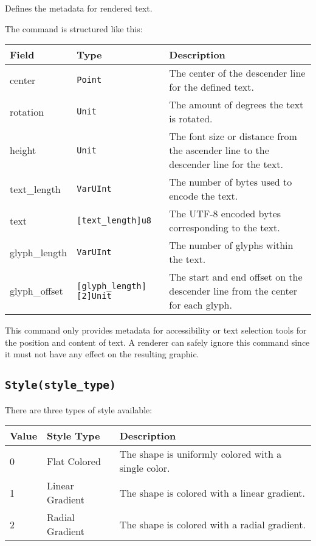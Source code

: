 \documentclass[]{article}
\begin{document}
Defines the metadata for rendered text.

The command is structured like this:

\begin{longtable}[]{@{}p{1in}p{1.6in}p{3.4in}@{}}
\toprule
Field & Type & Description \\
\midrule
\endhead
center        & \texttt{Point}                          & The center of the descender line for the defined text. \\
rotation      & \texttt{Unit}                           & The amount of degrees the text is rotated. \\
height        & \texttt{Unit}                           & The font size or distance from the ascender line to the descender line for the text. \\
text\_length  & \texttt{VarUInt}                        & The number of bytes used to encode the text. \\
text          & \texttt{{[}text\_length{]}u8}           & The UTF-8 encoded bytes corresponding to the text. \\
glyph\_length & \texttt{VarUInt}                        & The number of glyphs within the text. \\
glyph\_offset & \texttt{{[}glyph\_length{]}{[}2{]}Unit} & The start and end offset on the descender line from the center for each glyph. \\
\bottomrule
\end{longtable}

This command only provides metadata for accessibility or text selection tools
for the position and content of text. A renderer can safely ignore this command
since it must not have any effect on the resulting graphic.

\hypertarget{stylestyle_type}{\subsection{\texorpdfstring{\texttt{Style(style\_type)}}{Style(style\_type)}}\label{stylestyle_type}}

There are three types of style available:

\begin{longtable}[]{@{}p{0.5in}p{1in}p{4.5in}@{}}
\toprule
Value & Style Type & Description \\
\midrule
\endhead
0 & Flat Colored & The shape is uniformly colored with a single
color. \\
1 & Linear Gradient & The shape is colored with a linear gradient. \\
2 & Radial Gradient & The shape is colored with a radial gradient. \\
\bottomrule
\end{longtable}
\end{document}

